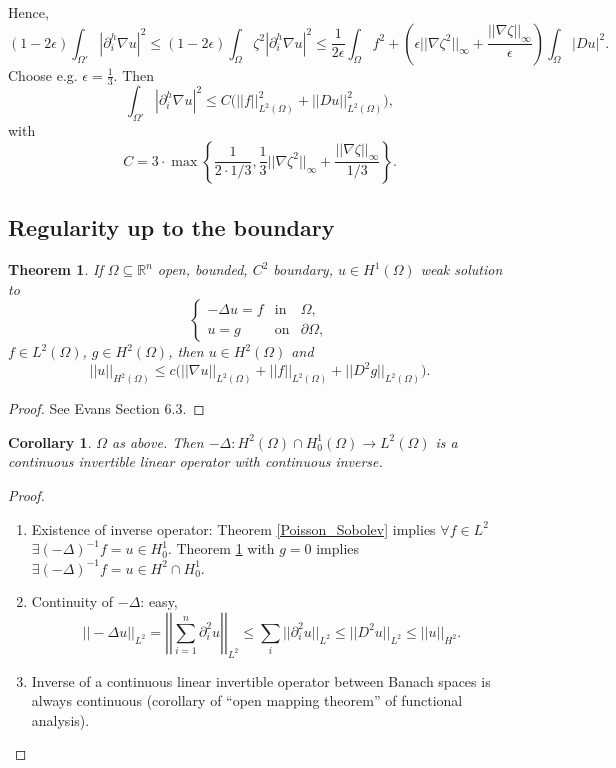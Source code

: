 \documentclass[12pt]{article}
\newtheorem{theorem}{Theorem}[section]
\newtheorem{corollary}{Corollary}[section]
\theoremstyle{definition}
\begin{document}
Hence,
\[(1-2\epsilon)\int_{\Omega'}|\partial_i^h\nabla u|^2\leq(1-2\epsilon)\int_\Omega\zeta^2|\partial_i^h\nabla u|^2\leq\frac1{2\epsilon}\int_\Omega f^2+\left(\epsilon||\nabla\zeta^2||_\infty+\frac{||\nabla\zeta||_\infty}\epsilon\right)\int_\Omega|Du|^2.\]
Choose e.g. $\epsilon=\frac13$. Then
\[\int_{\Omega'}|\partial_i^h\nabla u|^2\leq C\big(||f||_{L^2(\Omega)}^2+||Du||_{L^2(\Omega)}^2\big),\]
with
\[C=3\cdot\max\left\{\frac1{2\cdot1/3},\frac13||\nabla\zeta^2||_\infty+\frac{||\nabla\zeta||_\infty}{1/3}\right\}.\]

\subsection{Regularity up to the boundary}
\begin{theorem}\label{regular_H2}
If $\Omega\subseteq\mathbb R^n$ open, bounded, $C^2$ boundary, $u\in H^1(\Omega)$ weak solution to
\[\left\{\begin{array}{rcl}-\Delta u=f&\text{in}&\Omega,\\u=g&\text{on}&\partial\Omega,\end{array}\right.\]
$f\in L^2(\Omega)$, $g\in H^2(\Omega)$, then $u\in H^2(\Omega)$ and
\[||u||_{H^2(\Omega)}\leq c\big(||\nabla u||_{L^2(\Omega)}+||f||_{L^2(\Omega)}+||D^2g||_{L^2(\Omega)}\big).\]
\end{theorem}

\begin{proof}
See \cite{evans2010partial} Evans Section 6.3.
\end{proof}

\begin{corollary}
$\Omega$ as above. Then $-\Delta:H^2(\Omega)\cap H_0^1(\Omega)\rightarrow L^2(\Omega)$ is a continuous invertible linear operator with continuous inverse.
\end{corollary}

\begin{proof}
\begin{enumerate}[label=(\roman*)]
\item Existence of inverse operator: Theorem \ref{Poisson_Sobolev} implies $\forall f\in L^2$ $\exists(-\Delta)^{-1}f=u\in H_0^1$. Theorem \ref{regular_H2} with $g=0$ implies $\exists(-\Delta)^{-1}f=u\in H^2\cap H_0^1$.

\item Continuity of $-\Delta$: easy,
\[||-\Delta u||_{L^2}=\left|\left|\sum_{i=1}^n\partial_i^2u\right|\right|_{L^2}\leq\sum_i||\partial_i^2u||_{L^2}\leq||D^2u||_{L^2}\leq||u||_{H^2}.\]

\item Inverse of a continuous linear invertible operator between Banach spaces is always continuous (corollary of ``open mapping theorem'' of functional analysis).
\end{enumerate}
\end{proof}
\end{document}
